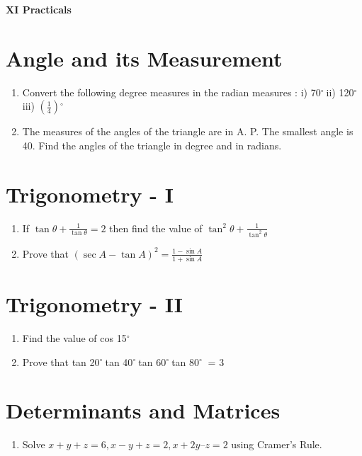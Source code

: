 \documentclass[17pt]{extarticle}
\newcommand{\degree}{$^{\circ}\ $} %
\begin{document}
\centering 
{\large \bf XI Practicals\par}
\vspace{1cm}
\begin{multicols}{2}

\section{Angle and its Measurement}
\noindent
\begin{enumerate}

\item Convert the following degree measures
in the radian measures : i) 70\degree ii) 120\degree iii) $\left(\frac{1}{4}\right)$\degree

\item The measures of the angles of the
triangle are in A. P. The smallest angle
is 40. Find the angles of the triangle in
degree and in radians.

\end{enumerate} 

\section{Trigonometry - I}
\noindent
\begin{enumerate}
\item If $\tan \theta + \frac{1}{\tan \theta}=2$ then find the value of $\tan^2\theta + \frac{1}{\tan^2\theta}$ 

\item  Prove that $(\sec A - \tan A)^2=\frac{1-\sin A}{1+\sin A}$
\end{enumerate}

\section{Trigonometry - II}
\noindent
\begin{enumerate}
\item Find the value of cos 15\degree

\item Prove that tan 20\degree tan 40\degree tan 60\degree tan 80\degree
= 3 

\end{enumerate} 

\section{ Determinants and Matrices}
\noindent
\begin{enumerate}
\item Solve $
x+y+z = 6,  x-y+z = 2,  x+2y–z = 2$ using Cramer's Rule.


\end{enumerate}
\end{multicols}
\end{document}
